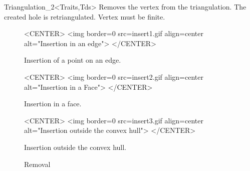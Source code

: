 \begin{ccClassTemplate}{Triangulation_2<Traits,Tds>}
{Removes the vertex from the triangulation. The created hole is 
 retriangulated.
 \ccPrecond Vertex  must be finite.}


\begin{figure}
\begin{ccTexOnly}
\begin{center}

\end{center}
\end{ccTexOnly}
\caption{Insertion of a point on an edge.
\label{I1_Fig_inser1t}}

\begin{ccHtmlOnly}
<CENTER>
<img border=0 src=insert1.gif align=center alt="Insertion in an edge">
</CENTER>
\end{ccHtmlOnly}
\end{figure}




\begin{figure}
\begin{ccTexOnly}
\begin{center}

\end{center}
\end{ccTexOnly}
\caption{Insertion in a face.
\label{I1_Fig_insert2}}

\begin{ccHtmlOnly}
<CENTER>
<img border=0 src=insert2.gif align=center alt="Insertion in a Face">
</CENTER>
\end{ccHtmlOnly}
\end{figure}


\begin{figure}
\begin{ccTexOnly}
\begin{center}

\end{center}
\end{ccTexOnly}
\caption{Insertion outside the convex hull.
\label{I1_Fig_insert3}}

\begin{ccHtmlOnly}
<CENTER>
<img border=0 src=insert3.gif align=center alt="Insertion outside the
convex hull">
</CENTER>
\end{ccHtmlOnly}
\end{figure}

\begin{figure}
\begin{ccTexOnly}
\begin{center}

\end{center}
\end{ccTexOnly}
\caption{Removal
\label{I1_Fig_remove}}


\end{figure}
\end{ccClassTemplate}
